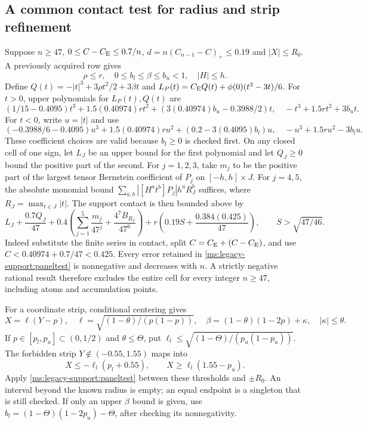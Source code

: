 \subsection{A common contact test for radius and strip refinement}
\label{ms:legacy-support:panels}
Suppose $n\ge47$, $0\le C-C_{\mathrm E}\le0.7/n$,
$d=n(C_{n-1}-C)_+\le0.19$ and
$|X|\le R_0$. A previously acquired row gives
\[
 \rho\le r,\quad 0\le b_l\le\beta\le b_u<1,\quad |H|\le h.
\]
Define $Q(t)=-|t|^3+3\rho t^2/2+3\beta t$ and
$L_P(t)=C_{\mathrm E} Q(t)+\phi(0)(t^3-3t)/6$.
For $t>0$, upper polynomials for $L_P(t),Q(t)$ are
\[
 (1/15-0.4095)t^3+1.5(0.40974)rt^2+(3(0.40974)b_u-0.3988/2)t,
 \quad -t^3+1.5rt^2+3b_ut.
\]
For $t<0$, write $u=|t|$ and use
\[
 (-0.3988/6-0.4095)u^3+1.5(0.40974)ru^2+(0.2-3(0.4095)b_l)u,
 \quad -u^3+1.5ru^2-3b_lu.
\]
These coefficient choices are valid because $b_l\ge0$ is checked first.
On any closed cell of one sign, let $L_J$ be an upper bound for the
first polynomial and let $Q_J\ge0$ bound the positive part of the second.
For $j=1,2,3$, take $m_j$ to be the positive part of the largest tensor
Bernstein coefficient of $P_j$ on $[-h,h]\times J$. For $j=4,5$, the
absolute monomial bound
$\sum_{a,b}|[H^at^b]P_j|h^aR_J^b$ suffices, where
$R_J=\max_{t\in J}|t|$. The support contact is then bounded above by
\begin{equation}\label{ms:legacy-support:paneltest}
 L_J+\frac{0.7Q_J}{47}
 +0.4\left(\sum_{j=1}^5\frac{m_j}{47^j}
                +\frac{4^7B_{R_J}}{47^6}\right)
 +r\left(0.19S+\frac{0.384(0.425)}{47}\right),
 \qquad S>\sqrt{47/46}.
\end{equation}
Indeed substitute the finite series in contact, split $C=C_{\mathrm E}+(C-C_{\mathrm E})$,
and use $C<0.40974+0.7/47<0.425$. Every error retained in
\eqref{ms:legacy-support:paneltest} is nonnegative and decreases with $n$.
A strictly negative rational result therefore excludes the entire cell
for every integer $n\ge47$, including atoms and accumulation points.

For a coordinate strip, conditional centering gives
\[
 X=\ell(Y-p),\quad
 \ell=\sqrt{(1-\theta)/(p(1-p))},\quad
 \beta=(1-\theta)(1-2p)+\kappa,\quad |\kappa|\le\theta.
\]
If $p\in[p_l,p_u]\subset(0,1/2)$ and $\theta\le\Theta$, put
$\ell_l\le\sqrt{(1-\Theta)/(p_u(1-p_u))}$.
The forbidden strip $Y\notin(-0.55,1.55)$ maps into
\[
 X\le-\ell_l(p_l+0.55),\qquad X\ge\ell_l(1.55-p_u).
\]
Apply \eqref{ms:legacy-support:paneltest} between these thresholds and $\pm R_0$.
An interval beyond the known radius is empty; an equal endpoint is a
singleton that is still checked. If only an upper $\beta$ bound is given,
use $b_l=(1-\Theta)(1-2p_u)-\Theta$, after checking its nonnegativity.

